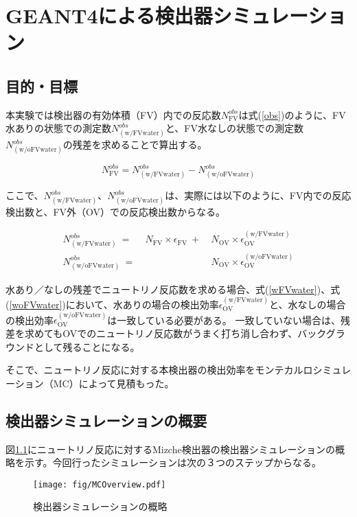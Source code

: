 \documentclass[11pt]{ltjsreport}
\newcommand{\figref}[1]{図\ref{#1}}
\newcommand{\equref}[1]{式(\ref{#1})}
\newcommand{\fv}{\mathrm{FV}}
\newcommand{\ov}{\mathrm{OV}}
\newcommand{\ww}{\mathrm{(w/ FVwater)}}
\newcommand{\wow}{\mathrm{(w/o FVwater)}}
\begin{document}
\chapter{GEANT4による検出器シミュレーション}
\label{MonteCalro}
\section{目的・目標}

本実験では検出器の有効体積（FV）内での反応数$N^{obs}_{\fv}$は\equref{obs}のように、FV水ありの状態での測定数$N^{obs}_{\ww}$と、FV水なしの状態での測定数$N^{obs}_{\wow}$の残差を求めることで算出する。

\begin{equation}
N^{obs}_{\fv} = N^{obs}_{\ww} - N^{obs}_{\wow}
\label{obs}
\end{equation}

ここで、$N^{obs}_{\ww}$、$N^{obs}_{\wow}$は、実際には以下のように、FV内での反応検出数と、FV外（OV）での反応検出数からなる。

\begin{eqnarray}
N^{obs}_{\ww} \ =&\ N_{\fv} \times \epsilon_{\fv} \ +& \ N_{\ov} \times \epsilon^{\ww}_{\ov}
\label{wFVwater}\\
N^{obs}_{\wow} \ =& & \ N_{\ov} \times \epsilon^{\wow}_{\ov}
\label{woFVwater}
\end{eqnarray}


水あり／なしの残差でニュートリノ反応数を求める場合、\equref{wFVwater}、\equref{woFVwater}において、水ありの場合の検出効率$\epsilon^{\ww}_{\ov}$と、水なしの場合の検出効率$\epsilon^{\wow}_{\ov}$は一致している必要がある。
一致していない場合は、残差を求めてもOVでのニュートリノ反応数がうまく打ち消し合わず、バックグラウンドとして残ることになる。

そこで、ニュートリノ反応に対する本検出器の検出効率をモンテカルロシミュレーション（MC）によって見積もった。

\section{検出器シミュレーションの概要}

\figref{MCOverview}にニュートリノ反応に対するMizche検出器の検出器シミュレーションの概略を示す。今回行ったシミュレーションは次の３つのステップからなる。

\begin{figure}[htbp]
\centering
\texttt{[image: fig/MCOverview.pdf]}
\caption[検出器シミュレーションの概略]{検出器シミュレーションの概略}
\label{MCOverview}
\end{figure}
\end{document}
